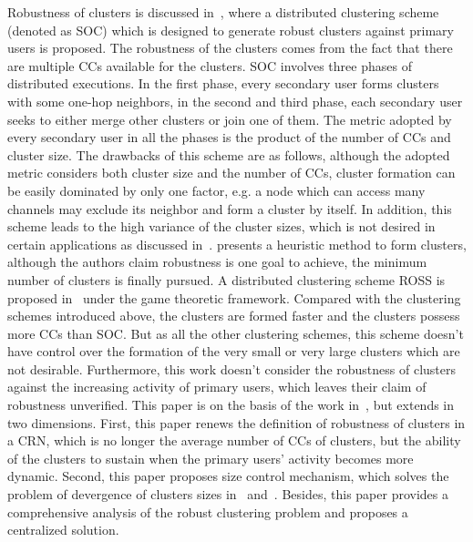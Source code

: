 \documentclass[times]{ettauth}
\newcommand{\ie}{i.e., }
\theoremstyle{mytheoremstyle}
\theoremstyle{mytheoremstyle}
\theoremstyle{mytheoremstyle}
\begin{document}
Robustness of clusters is discussed in~\cite{LIU_TMC11_2}, where a distributed clustering scheme (denoted as SOC) which is designed to generate robust clusters against primary users is proposed.
The robustness of the clusters comes from the fact that there are multiple CCs available for the clusters.
SOC involves three phases of distributed executions.
In the first phase, every secondary user forms clusters with some one-hop neighbors, in the second and third phase, each secondary user seeks to either merge other clusters or join one of them.
The metric adopted by every secondary user in all the phases is the product of the number of CCs and cluster size.
The drawbacks of this scheme are as follows, although the adopted metric considers both cluster size and the number of CCs, cluster formation can be easily dominated by only one factor, e.g. a node which can access many channels may exclude its neighbor and form a cluster by itself.
In addition, this scheme leads to the high variance of the cluster sizes, which is not desired in certain applications as discussed in~\cite{clustering_globecom11, cluster_EW10}.
\cite{mansoor_15_cluster_robust} presents a heuristic method to form clusters, although the authors claim robustness is one goal to achieve, the minimum number of clusters is finally pursued.
%
A distributed clustering scheme ROSS is proposed in~\cite{Li11_ROSS} under the game theoretic framework. 
Compared with the clustering schemes introduced above, the clusters are formed faster and the clusters possess more CCs than SOC.
But as all the other clustering schemes, this scheme doesn't have control over the formation of the very small or very large clusters which are not desirable.
Furthermore, this work doesn't consider the robustness of clusters against the increasing activity of primary users, which leaves their claim of robustness unverified.
%
This paper is on the basis of the work in~\cite{Li11_ROSS}, but extends in two dimensions.
First, this paper renews the definition of robustness of clusters in a CRN, which is no longer the average number of CCs of clusters, but the ability of the clusters to sustain when the primary users' activity becomes more dynamic.
Second, this paper proposes size control mechanism, which solves the problem of devergence of clusters sizes in~\cite{Li11_ROSS} and~\cite{LIU_TMC11_2}.
Besides, this paper provides a comprehensive analysis of the robust clustering problem and proposes a centralized solution. 
\end{document}
